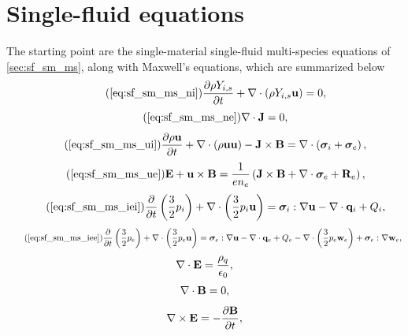 \documentclass[a4paper,11pt]{report}
\begin{document}
\section{Single-fluid equations}
The starting point are the single-material single-fluid multi-species equations of \cref{sec:sf_sm_ms}, along with Maxwell's equations, which are summarized below
\begin{equation}
    \tag{\ref{eq:sf_sm_ms_ni}}
    \frac{\partial \rho Y_{i,s}}{\partial t} + \nabla \cdot \left( \rho Y_{i,s} \uvec \right) = 0,
\end{equation}
\begin{equation}
    \tag{\ref{eq:sf_sm_ms_ne}}
    \nabla \cdot \Jvec = 0,
\end{equation}
\begin{equation}
    \tag{\ref{eq:sf_sm_ms_ui}}
    \frac{\partial \rho \uvec}{\partial t} + \nabla \cdot \left( \rho \uvec \uvec \right) - \Jvec \times \Bvec = \nabla \cdot \left( \sigmavec_i + \sigmavec_e \right),
\end{equation}
\begin{equation}
    \tag{\ref{eq:sf_sm_ms_ue}}
    \Evec + \uvec \times \Bvec = \frac{1}{e n_e} \left( \Jvec \times \Bvec + \nabla \cdot \sigmavec_e + \Rvec_e \right) ,
\end{equation}
\begin{equation}
    \tag{\ref{eq:sf_sm_ms_iei}}
    \frac{\partial}{\partial t} \left( \frac{3}{2} p_i \right) + \nabla \cdot \left( \frac{3}{2} p_i \uvec \right) = \sigmavec_i : \nabla \uvec - \nabla \cdot \qvec_i + Q_i,
\end{equation}
\begin{equation}
    \tag{\ref{eq:sf_sm_ms_iee}}
    \frac{\partial}{\partial t} \left( \frac{3}{2} p_e \right) + \nabla \cdot \left( \frac{3}{2} p_e \uvec \right) = \sigmavec_e : \nabla \uvec - \nabla \cdot \qvec_e + Q_e - \nabla \cdot \left( \frac{3}{2} p_e \wvec_e \right) + \sigmavec_e : \nabla \wvec_e,
\end{equation}
\begin{equation}
    \label{eq:sf_sm_ms_maxwell_3}
    \nabla \cdot \mathbf{E} = \frac{\rho_q}{\epsilon_0},
\end{equation}
\begin{equation}
    \label{eq:sf_sm_ms_maxwell_4}
    \nabla \cdot \mathbf{B} = 0,
\end{equation}
\begin{equation}
    \label{eq:sf_sm_ms_maxwell_1}
    \nabla \times \mathbf{E} = -\frac{ \partial \mathbf{B}}{\partial t},
\end{equation}
\end{document}
